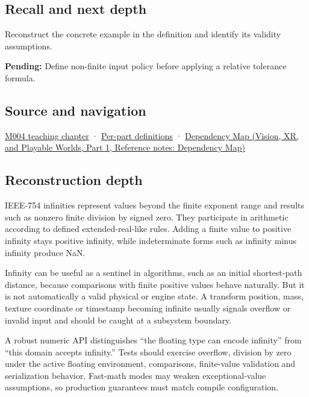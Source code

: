 \subsection{Recall and next depth}\label{appendix-eb336149c00a-recall-and-next-depth}

\hypertarget{appendix-eb336149c00a-recall-and-next-depth}{}

Reconstruct the concrete example in the definition and identify its validity assumptions.

\textbf{Pending:} Define non-finite input policy before applying a relative tolerance formula.

\subsection{Source and navigation}\label{appendix-eb336149c00a-source-and-navigation}

\hypertarget{appendix-eb336149c00a-source-and-navigation}{}

\hyperref[01-foundations-i-ch001-a-stretching-ruler-for-real-valued-quantities]{M004 teaching chapter} · \hyperref[appendix-fd090d982a15-m004---parts-61-76]{Per-part definitions} · \href{../07-Vision-XR-and-Playable-Worlds-P01/main.pdf\#appendix-4ad47bdd269a}{Dependency Map (Vision, XR, and Playable Worlds, Part 1, Reference notes: Dependency Map)}

\subsection{Reconstruction depth}\label{appendix-eb336149c00a-reconstruction-depth}

\hypertarget{appendix-eb336149c00a-reconstruction-depth}{}

IEEE-754 infinities represent values beyond the finite exponent range and results such as nonzero finite division by signed zero. They participate in arithmetic according to defined extended-real-like rules. Adding a finite value to positive infinity stays positive infinity, while indeterminate forms such as infinity minus infinity produce NaN.

Infinity can be useful as a sentinel in algorithms, such as an initial shortest-path distance, because comparisons with finite positive values behave naturally. But it is not automatically a valid physical or engine state. A transform position, mass, texture coordinate or timestamp becoming infinite usually signals overflow or invalid input and should be caught at a subsystem boundary.

A robust numeric API distinguishes ``the floating type can encode infinity'' from ``this domain accepts infinity.'' Tests should exercise overflow, division by zero under the active floating environment, comparisons, finite-value validation and serialization behavior. Fast-math modes may weaken exceptional-value assumptions, so production guarantees must match compile configuration.
